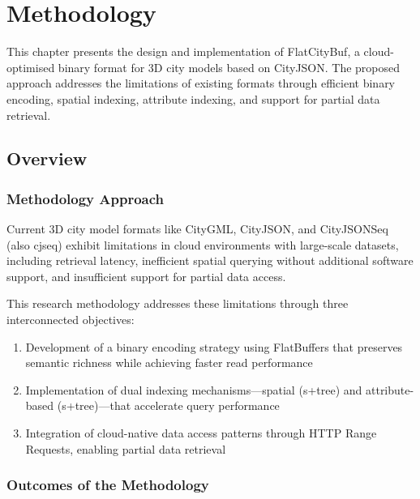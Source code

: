 
\chapter{Methodology}
\label{methodology}

This chapter presents the design and implementation of FlatCityBuf, a cloud-optimised binary format for 3D city models based on CityJSON. The proposed approach addresses the limitations of existing formats through efficient binary encoding, spatial indexing, attribute indexing, and support for partial data retrieval.

\section{Overview}
\label{methodology:overview}

\subsection{Methodology Approach}
\label{methodology:overview:approach}

Current 3D city model formats like CityGML, CityJSON, and CityJSONSeq (also \ac{cjseq}) exhibit limitations in cloud environments with large-scale datasets, including retrieval latency, inefficient spatial querying without additional software support, and insufficient support for partial data access.

This research methodology addresses these limitations through three interconnected objectives:

\begin{enumerate}
    \item Development of a binary encoding strategy using FlatBuffers that preserves semantic richness while achieving faster read performance
    \item Implementation of dual indexing mechanisms—spatial (\ac{s+tree}) and attribute-based (\ac{s+tree})—that accelerate query performance
    \item Integration of cloud-native data access patterns through HTTP Range Requests, enabling partial data retrieval
\end{enumerate}

\subsection{Outcomes of the Methodology}
\label{methodology:overview:outcomes}

